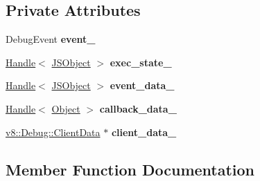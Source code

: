 \subsection*{Private Attributes}
\begin{DoxyCompactItemize}
\item 
Debug\+Event {\bfseries event\+\_\+}\hypertarget{classv8_1_1internal_1_1_event_details_impl_ab74c544b2c8356e13d8960583f7063ca}{}\label{classv8_1_1internal_1_1_event_details_impl_ab74c544b2c8356e13d8960583f7063ca}

\item 
\hyperlink{classv8_1_1internal_1_1_handle}{Handle}$<$ \hyperlink{classv8_1_1internal_1_1_j_s_object}{J\+S\+Object} $>$ {\bfseries exec\+\_\+state\+\_\+}\hypertarget{classv8_1_1internal_1_1_event_details_impl_adde8e09cbed69fa11e21922c6a14eaae}{}\label{classv8_1_1internal_1_1_event_details_impl_adde8e09cbed69fa11e21922c6a14eaae}

\item 
\hyperlink{classv8_1_1internal_1_1_handle}{Handle}$<$ \hyperlink{classv8_1_1internal_1_1_j_s_object}{J\+S\+Object} $>$ {\bfseries event\+\_\+data\+\_\+}\hypertarget{classv8_1_1internal_1_1_event_details_impl_a1408fa47f0e34573b818c8b6d9de8800}{}\label{classv8_1_1internal_1_1_event_details_impl_a1408fa47f0e34573b818c8b6d9de8800}

\item 
\hyperlink{classv8_1_1internal_1_1_handle}{Handle}$<$ \hyperlink{classv8_1_1internal_1_1_object}{Object} $>$ {\bfseries callback\+\_\+data\+\_\+}\hypertarget{classv8_1_1internal_1_1_event_details_impl_a26dc7cfc8bc68a6be6d9e547b1354a45}{}\label{classv8_1_1internal_1_1_event_details_impl_a26dc7cfc8bc68a6be6d9e547b1354a45}

\item 
\hyperlink{classv8_1_1_debug_1_1_client_data}{v8\+::\+Debug\+::\+Client\+Data} $\ast$ {\bfseries client\+\_\+data\+\_\+}\hypertarget{classv8_1_1internal_1_1_event_details_impl_aece200ab7dd075b7a9d95a471f8ba274}{}\label{classv8_1_1internal_1_1_event_details_impl_aece200ab7dd075b7a9d95a471f8ba274}

\end{DoxyCompactItemize}


\subsection{Member Function Documentation}
